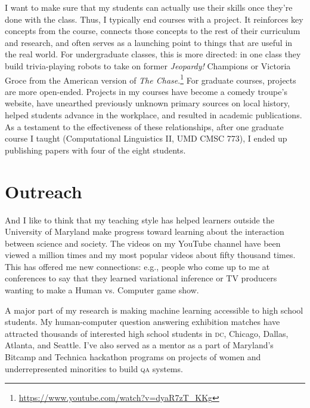 \documentclass[11pt]{amsart}
\newcommand{\abr}[1]{\textsc{#1}}
\begin{document}
I want to make sure that my students can actually use their skills
once they're done with the class.  Thus, I typically end courses with
a project.  It reinforces key concepts from the course, connects those
concepts to the rest of their curriculum and research, and often
serves as a launching point to things that are useful in the real
world.  For undergraduate classes, this is more directed: in one class
they build trivia-playing robots to take on former \textit{Jeopardy!} Champions
or Victoria Groce from the American version of \textit{The
  Chase}.\footnote{\href{https://www.youtube.com/watch?v=dyaR7zT_KKg}{https://www.youtube.com/watch?v=dyaR7zT\_KKg}}  For
graduate courses, projects are more open-ended.  Projects in my
courses have become a comedy troupe's website, have unearthed
previously unknown primary sources on local history, helped students
advance in the workplace, and resulted in academic publications.  As a
testament to the effectiveness of these relationships, after one
graduate course I taught (Computational Linguistics II, UMD CMSC 773),
I ended up publishing papers with four of the eight students.


\section{Outreach}

And I like to think that my teaching style has helped learners outside
the University of Maryland make progress toward learning about the
interaction between science and society.  The videos on my YouTube
channel have been viewed a million times and my most popular videos
about fifty thousand times.  This has offered me new connections:
e.g., people who come up to me at conferences to say that they learned
variational inference or TV producers wanting to make a Human
vs. Computer game show.

A major part of my research is making machine learning accessible to
high school students.
%
My human-computer question answering exhibition matches have attracted
thousands of interested high school students in \abr{dc}, Chicago,
Dallas, Atlanta, and Seattle.
%
I've also served as a mentor as a part of Maryland's Bitcamp and
Technica hackathon programs on projects of women and underrepresented
minorities to build \abr{qa} systems.
\end{document}
